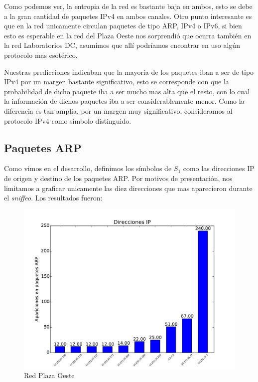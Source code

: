 Como podemos ver, la entropia de la red es bastante baja en ambos, esto se debe a la gran cantidad de paquetes IPv4 en ambos canales. Otro punto interesante es que en la red unicamente circulan paquetes de tipo ARP, IPv4 o IPv6, si bien esto es esperable en la red del Plaza Oeste nos sorprendió que ocurra también en la red Laboratorios DC, asumimos que allí podríamos encontrar en uso algún protocolo mas esotérico.

Nuestras predicciones indicaban que la mayoría de los paquetes iban a ser de tipo IPv4 por un margen bastante significativo, esto se corresponde con que la probabilidad de dicho paquete iba a ser mucho mas alta que el resto, con lo cual la información de dichos paquetes iba a ser considerablemente menor. Como la diferencia es tan amplia, por un margen muy significativo, consideramos al protocolo IPv4 como símbolo distinguido.

\pagebreak

\subsection{Paquetes ARP}

Como vimos en el desarrollo, definimos los símbolos de $S_1$ como las direcciones IP de origen y destino de los paquetes ARP. Por motivos de presentación, nos limitamos a graficar unicamente las diez direcciones que mas aparecieron durante el \textit{sniffeo}. Los resultados fueron:


\begin{figure}[ht]
\begin{center}
\includegraphics[width=0.6\columnwidth]{graficos/plaza_top_s2.pdf}
\caption{Red Plaza Oeste}
\end{center}
\end{figure}

